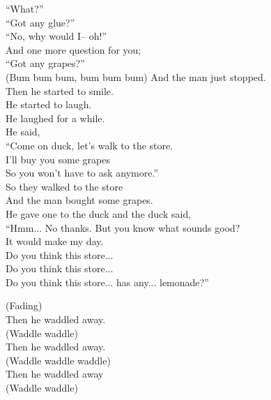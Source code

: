 ``What?''\\
``Got any glue?''\\
``No, why would I– oh!''\\
And one more question for you;\\
``Got any grapes?''\\
(Bum bum bum, bum bum bum)
\newpage
And the man just stopped.\\
Then he started to smile.\\
He started to laugh.\\
He laughed for a while.\\
He said,\\
``Come on duck, let’s walk to the store.\\
I’ll buy you some grapes\\
So you won't have to ask anymore.''\\
So they walked to the store\\
And the man bought some grapes.\\
He gave one to the duck and the duck said,\\
``Hmm... No thanks. But you know what sounds good?\\
It would make my day.\\
Do you think this store...\\
Do you think this store...\\
Do you think this store... has any... lemonade?''\par
\vspace{10pt}
(Fading)\\
Then he waddled away.\\
(Waddle waddle)\\
Then he waddled away.\\
(Waddle waddle waddle)\\
Then he waddled away\\
(Waddle waddle)

